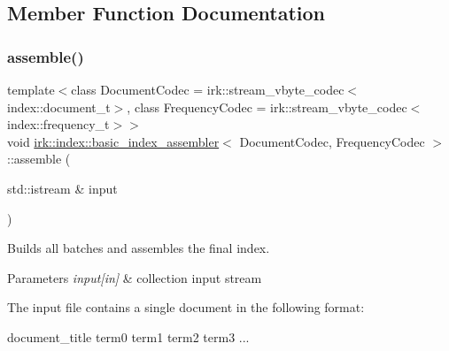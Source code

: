 \subsection{Member Function Documentation}
\mbox{\label{classirk_1_1index_1_1basic__index__assembler_ad5d719c185d511614fd008757bfc27e3}} 
\subsubsection{\texorpdfstring{assemble()}{assemble()}}
{\footnotesize\ttfamily template$<$class Document\+Codec  = irk\+::stream\+\_\+vbyte\+\_\+codec$<$index\+::document\+\_\+t$>$, class Frequency\+Codec  = irk\+::stream\+\_\+vbyte\+\_\+codec$<$index\+::frequency\+\_\+t$>$$>$ \\
void \mbox{\hyperlink{classirk_1_1index_1_1basic__index__assembler}{irk\+::index\+::basic\+\_\+index\+\_\+assembler}}$<$ Document\+Codec, Frequency\+Codec $>$\+::assemble (\begin{DoxyParamCaption}\item[{std\+::istream \&}]{input }\end{DoxyParamCaption})\hspace{0.3cm}{\ttfamily [inline]}}



Builds all batches and assembles the final index. 


\begin{DoxyParams}{Parameters}
{\em input\mbox{[}in\mbox{]}} & collection input stream\\
\hline
\end{DoxyParams}
The input file contains a single document in the following format\+: 
\begin{DoxyCode}
document\_title   term0 term1 term2 term3 ...
\end{DoxyCode}
 \mbox{\label{classirk_1_1index_1_1basic__index__assembler_a192d5783c1b7a836f9e96e04ef317b22}} 
